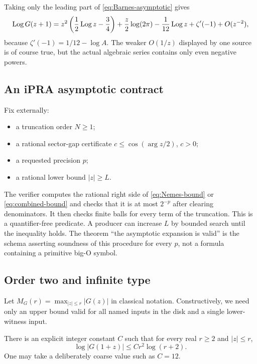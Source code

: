 Taking only the leading part of \cref{eq:Barnes-asymptotic} gives
\begin{equation}\label{eq:leading-asymptotic}
 \operatorname{Log} G(z+1)
 =z^2\left(\frac12\operatorname{Log} z-\frac34\right)
 +\frac z2\log(2\pi)-\frac1{12}\operatorname{Log} z+\zeta'(-1)
 +O(z^{-2}),
\end{equation}
because \(\zeta'(-1)=1/12-\log A\).  The weaker \(O(1/z)\) displayed by one
source is of course true, but the actual algebraic series contains only even
negative powers.

\subsection{An iPRA asymptotic contract}

Fix externally:
\begin{itemize}
\item a truncation order \(N\ge1\);
\item a rational sector-gap certificate \(c\le\cos(\arg z/2)\), \(c>0\);
\item a requested precision \(p\);
\item a rational lower bound \(|z|\ge L\).
\end{itemize}
The verifier computes the rational right side of
\cref{eq:Nemes-bound} or \cref{eq:combined-bound} and checks that it is at most
\(2^{-p}\) after clearing denominators.  It then checks finite balls for every
term of the truncation.  This is a quantifier-free predicate.  A producer can
increase \(L\) by bounded search until the inequality holds.  The theorem
``the asymptotic expansion is valid'' is the schema asserting soundness of this
procedure for every \(p\), not a formula containing a primitive big-O symbol.

\subsection{Order two and infinite type}

Let
\(
M_G(r)=\max_{|z|\le r}|G(z)|
\)
in classical notation.  Constructively, we need only an upper bound valid for
all named inputs in the disk and a single lower-witness input.

\begin{lemma}\label{lem:order-upper}
There is an explicit integer constant \(C\) such that for every real
\(r\ge2\) and \(|z|\le r\),
\begin{equation}\label{eq:order-upper}
 \log|G(1+z)|\le C r^2\log(r+2).
\end{equation}
One may take a deliberately coarse value such as \(C=12\).
\end{lemma}

